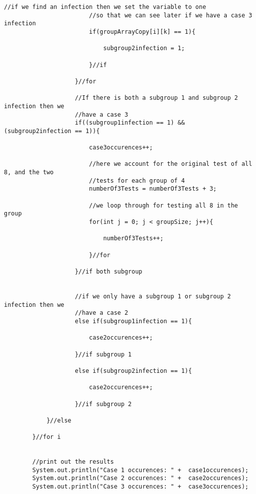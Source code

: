 \documentclass[letterpaper, 10pt,DIV=13]{scrartcl}
\numberwithin{equation}{section} %
\numberwithin{figure}{section} %
\numberwithin{table}{section} %
\begin{document}
\begin{lstlisting}[frame=single, ]
                        //if we find an infection then we set the variable to one
                        //so that we can see later if we have a case 3 infection
                        if(groupArrayCopy[i][k] == 1){
                            
                            subgroup2infection = 1;

                        }//if
    
                    }//for

                    //If there is both a subgroup 1 and subgroup 2 infection then we 
                    //have a case 3
                    if((subgroup1infection == 1) && (subgroup2infection == 1)){

                        case3occurences++;
                        
                        //here we account for the original test of all 8, and the two 
                        //tests for each group of 4
                        numberOf3Tests = numberOf3Tests + 3;

                        //we loop through for testing all 8 in the group
                        for(int j = 0; j < groupSize; j++){

                            numberOf3Tests++;
                            
                        }//for

                    }//if both subgroup


                    //if we only have a subgroup 1 or subgroup 2 infection then we
                    //have a case 2
                    else if(subgroup1infection == 1){

                        case2occurences++;

                    }//if subgroup 1

                    else if(subgroup2infection == 1){

                        case2occurences++;

                    }//if subgroup 2

            }//else

        }//for i 


        //print out the results
        System.out.println("Case 1 occurences: " +  case1occurences);
        System.out.println("Case 2 occurences: " +  case2occurences);
        System.out.println("Case 3 occurences: " +  case3occurences);
        

\end{lstlisting}
\end{document}
